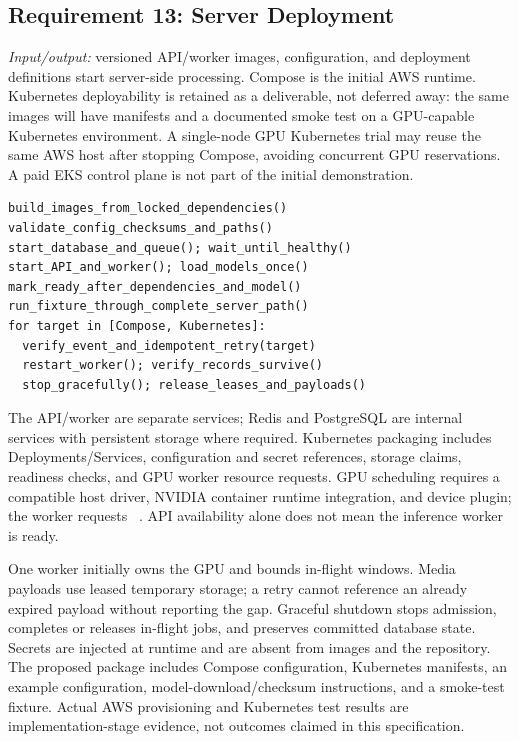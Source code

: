 \subsection{Requirement 13: Server Deployment}
\textit{Input/output:} versioned API/worker images, configuration, and deployment definitions start server-side processing. Compose is the initial AWS runtime. Kubernetes deployability is retained as a deliverable, not deferred away: the same images will have manifests and a documented smoke test on a GPU-capable Kubernetes environment. A single-node GPU Kubernetes trial may reuse the same AWS host after stopping Compose, avoiding concurrent GPU reservations. A paid EKS control plane is not part of the initial demonstration.
\par\smallskip\noindent\begin{minipage}{\columnwidth}
\begin{lstlisting}
build_images_from_locked_dependencies()
validate_config_checksums_and_paths()
start_database_and_queue(); wait_until_healthy()
start_API_and_worker(); load_models_once()
mark_ready_after_dependencies_and_model()
run_fixture_through_complete_server_path()
for target in [Compose, Kubernetes]:
  verify_event_and_idempotent_retry(target)
  restart_worker(); verify_records_survive()
  stop_gracefully(); release_leases_and_payloads()
\end{lstlisting}
\end{minipage}\par
The API/worker are separate services; Redis and PostgreSQL are internal services with persistent storage where required. Kubernetes packaging includes Deployments/Services, configuration and secret references, storage claims, readiness checks, and GPU worker resource requests. GPU scheduling requires a compatible host driver, NVIDIA container runtime integration, and device plugin; the worker requests ~\cite{k8sgpu,composegpu}. API availability alone does not mean the inference worker is ready.

One worker initially owns the GPU and bounds in-flight windows. Media payloads use leased temporary storage; a retry cannot reference an already expired payload without reporting the gap. Graceful shutdown stops admission, completes or releases in-flight jobs, and preserves committed database state. Secrets are injected at runtime and are absent from images and the repository. The proposed package includes Compose configuration, Kubernetes manifests, an example configuration, model-download/checksum instructions, and a smoke-test fixture. Actual AWS provisioning and Kubernetes test results are implementation-stage evidence, not outcomes claimed in this specification.
